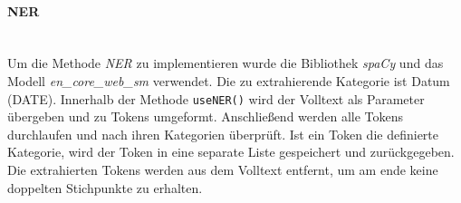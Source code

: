 \paragraph{NER}\mbox{}\\
Um die Methode \emph{NER} zu implementieren wurde die Bibliothek \emph{spaCy} und das Modell \emph{en\_core\_web\_sm} verwendet. 
Die zu extrahierende Kategorie ist Datum (DATE). Innerhalb der Methode \lstinline{useNER()} wird der Volltext als Parameter übergeben und zu Tokens umgeformt. Anschließend werden alle Tokens durchlaufen und nach ihren Kategorien überprüft. Ist ein Token die definierte Kategorie, wird der Token in eine separate Liste gespeichert und zurückgegeben. Die extrahierten Tokens werden aus dem Volltext entfernt, um am ende keine doppelten Stichpunkte zu erhalten.
